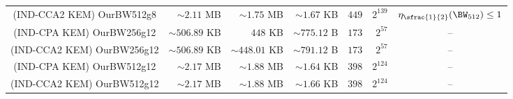 \begin{table}[htbp]
\begin{tabular}{crrrrrc}
		(IND-CCA2 KEM) OurBW512g8 & $\sim 2.11$ MB & $\sim 1.75$ MB & $\sim 1.67$ KB & $449$ & $2^{139}$ & $\eta_{\sfrac{1}{2}}(\BW_{512}) \leq 1$ \\
		(IND-CPA KEM) OurBW256g12 & $\sim 506.89$ KB & $448$ KB & $\sim 775.12$ B & $173$ & $2^{57}$ & -- \\
		(IND-CCA2 KEM) OurBW256g12 & $\sim 506.89$ KB & $\sim 448.01$ KB & $\sim 791.12$ B & $173$ & $2^{57}$ & -- \\
		(IND-CPA KEM) OurBW512g12 & $\sim 2.17$ MB & $\sim 1.88$ MB & $\sim 1.64$ KB & $398$ & $2^{124}$ & -- \\
		(IND-CCA2 KEM) OurBW512g12 & $\sim 2.17$ MB & $\sim 1.88$ MB & $\sim 1.66$ KB & $398$ & $2^{124}$ & -- \\
		\bottomrule
	\end{tabular}
\end{table}
